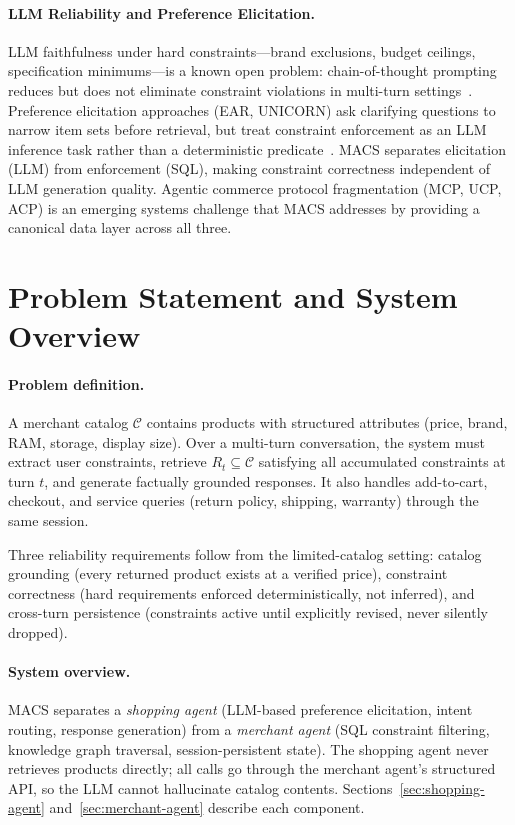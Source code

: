 \documentclass[sigconf,anonymous]{acmart}
\begin{document}
\paragraph{LLM Reliability and Preference Elicitation.}
LLM faithfulness under hard constraints---brand exclusions, budget ceilings,
specification minimums---is a known open problem:
chain-of-thought prompting reduces but does not eliminate constraint violations in
multi-turn settings~\cite{Jannach2021Survey,Feng2023LLMCRS}.
Preference elicitation approaches (EAR, UNICORN) ask clarifying questions to
narrow item sets before retrieval, but treat constraint enforcement as an LLM
inference task rather than a deterministic predicate~\cite{Christakopoulou2016,Sun2018}.
MACS separates elicitation (LLM) from enforcement (SQL), making constraint
correctness independent of LLM generation quality.
Agentic commerce protocol fragmentation (MCP, UCP, ACP) is an emerging systems
challenge that MACS addresses by providing a canonical data layer across all three.



\section{Problem Statement and System Overview}
\label{sec:problem}

\paragraph{Problem definition.}
A merchant catalog $\mathcal{C}$ contains products with structured attributes
(price, brand, RAM, storage, display size). Over a multi-turn conversation,
the system must extract user constraints, retrieve $R_t \subseteq \mathcal{C}$
satisfying all accumulated constraints at turn $t$, and generate factually
grounded responses. It also handles add-to-cart, checkout, and service queries
(return policy, shipping, warranty) through the same session.

Three reliability requirements follow from the limited-catalog setting:
catalog grounding (every returned product exists at a verified price),
constraint correctness (hard requirements enforced deterministically, not
inferred), and cross-turn persistence (constraints active until explicitly
revised, never silently dropped).

\paragraph{System overview.}
MACS separates a \emph{shopping agent} (LLM-based preference elicitation,
intent routing, response generation) from a \emph{merchant agent} (SQL
constraint filtering, knowledge graph traversal, session-persistent state).
The shopping agent never retrieves products directly; all calls go through
the merchant agent's structured API, so the LLM cannot hallucinate catalog
contents. Sections~\ref{sec:shopping-agent} and~\ref{sec:merchant-agent}
describe each component.
\end{document}
